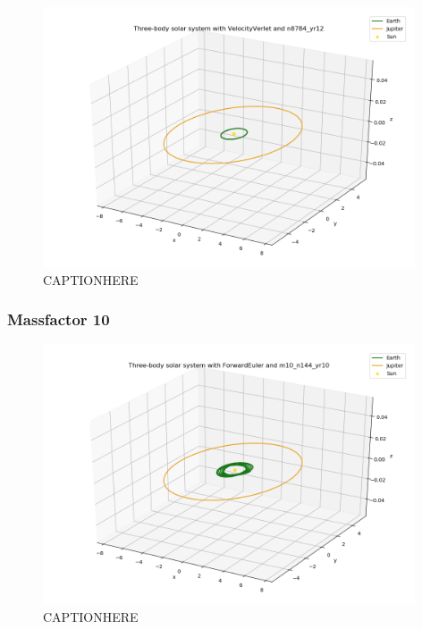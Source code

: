 \documentclass{article}
\begin{document}
    \begin{figure}[H]
        \centering
        \includegraphics[width = 11cm]{img/plot3D_S_E_J_V_n8784_yr12.png}
        \caption{CAPTIONHERE}
        \label{fig:plot3D_S_E_J_V_n8784_yr12}
    \end{figure}

\subsubsection{Massfactor 10}

    \begin{figure}[H]
        \centering
        \includegraphics[width = 11cm]{img/plot3D_S_E_J_F_m10_n144_yr10.png}
        \caption{CAPTIONHERE}
        \label{fig:plot3D_S_E_J_F_m10_n144_yr10}
    \end{figure}
\end{document}
